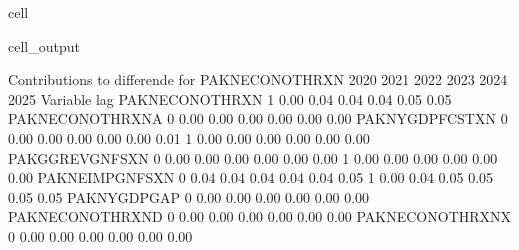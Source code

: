 \documentclass[letterpaper,10pt,english]{jupyterBook}
\begin{document}
\begin{sphinxuseclass}{cell}
\begin{sphinxVerbatimOutput}
\begin{sphinxuseclass}{cell_output}
\begin{sphinxVerbatim}[commandchars=\\\{\}]
 Contributions to differende for  PAKNECONOTHRXN
                           2020       2021       2022       2023       2024       2025
Variable         lag                                                                  
PAKNECONOTHRXN   \PYGZhy{}1        0.00       0.04       0.04       0.04       0.05       0.05
PAKNECONOTHRXN\PYGZus{}A  0        0.00       0.00       0.00       0.00       0.00       0.00
PAKNYGDPFCSTXN    0       \PYGZhy{}0.00      \PYGZhy{}0.00      \PYGZhy{}0.00       0.00       0.00       0.01
                 \PYGZhy{}1        0.00       0.00       0.00       0.00      \PYGZhy{}0.00      \PYGZhy{}0.00
PAKGGREVGNFSXN    0        0.00       0.00       0.00       0.00       0.00       0.00
                 \PYGZhy{}1        0.00       0.00       0.00       0.00       0.00       0.00
PAKNEIMPGNFSXN    0        0.04       0.04       0.04       0.04       0.04       0.05
                 \PYGZhy{}1        0.00      \PYGZhy{}0.04      \PYGZhy{}0.05      \PYGZhy{}0.05      \PYGZhy{}0.05      \PYGZhy{}0.05
PAKNYGDPGAP\PYGZus{}      0       \PYGZhy{}0.00       0.00       0.00       0.00       0.00       0.00
PAKNECONOTHRXN\PYGZus{}D  0        0.00       0.00       0.00       0.00       0.00       0.00
PAKNECONOTHRXN\PYGZus{}X  0        0.00       0.00       0.00       0.00       0.00       0.00


\end{sphinxVerbatim}
\end{sphinxuseclass}
\end{sphinxVerbatimOutput}
\end{sphinxuseclass}
\end{document}
